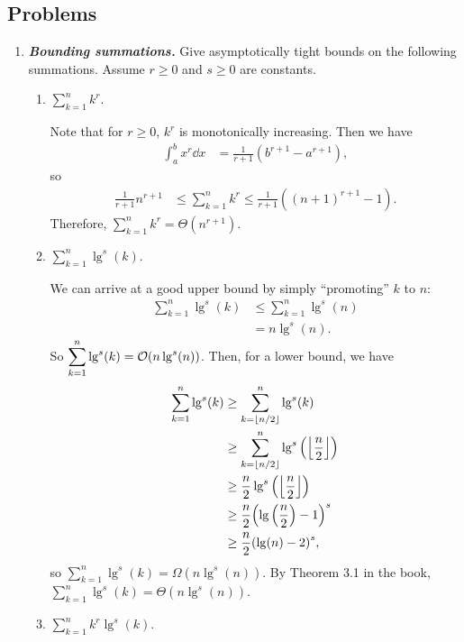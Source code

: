 \documentclass[AppendixA]{subfiles}
\begin{document}
	\subsection*{Problems}

	\begin{enumerate}[leftmargin=\labelsep,label={\textbf{\thesection-\arabic*}}]
		\item \textbf{\textit{Bounding summations.}} Give asymptotically tight bounds on the following summations. Assume $r \geq 0$ and $s \geq 0$ are constants.
		\begin{enumerate}
			\item $\displaystyle \sum_{k = 1}^n k^r$.
			\begin{answer}
				Note that for $r \geq 0$, $k^r$ is monotonically increasing. Then we have
				\begin{align*}
					\int_a^b x^r \dd x &= \frac{1}{r + 1}(b^{r + 1} - a^{r + 1}),
				\end{align*}
				so
				\begin{align*}
					\frac{1}{r + 1} n^{r + 1} &\leq \sum_{k = 1}^n k^r \leq \frac{1}{r + 1}((n + 1)^{r + 1} - 1).
				\end{align*}
				Therefore, $\displaystyle \sum_{k = 1}^n k^r = \Theta(n^{r + 1})$.
			\end{answer}

			\item \label{exer:appA-log-sum-bound} $\displaystyle \sum_{k = 1}^n \lg^s(k)$.
			\begin{answer}
				We can arrive at a good upper bound by simply ``promoting'' $k$ to $n$:
				\begin{align*}
					\sum_{k = 1}^n \lg^s(k) &\leq \sum_{k = 1}^n \lg^s(n)\\
						&= n\lg^s(n).
				\end{align*}
				So $\displaystyle \sum_{k = 1}^n \lg^s(k) = \mathcal{O}(n\lg^s(n))$. Then, for a lower bound, we have
				\begin{align*}
					\sum_{k = 1}^n \lg^s(k) &\geq \sum_{k = \lfloor n / 2 \rfloor}^n \lg^s(k)\\
						&\geq \sum_{k = \lfloor n / 2 \rfloor}^n \lg^s \qty(\left\lfloor \frac{n}{2} \right\rfloor)\\
						&\geq \frac{n}{2} \lg^s\qty(\left\lfloor \frac{n}{2} \right\rfloor)\\
						&\geq \frac{n}{2} \qty(\lg \qty(\frac{n}{2}) - 1)^s\\
						&\geq \frac{n}{2} \qty(\lg(n) - 2)^s,
				\end{align*}
				so $\displaystyle \sum_{k = 1}^n \lg^s(k) = \Omega(n\lg^s(n))$. By Theorem 3.1 in the book, $\displaystyle \sum_{k = 1}^n \lg^s(k) = \Theta(n\lg^s(n))$.
			\end{answer}
			
			\item $\displaystyle \sum_{k = 1}^n k^r\lg^s(k)$.
			\begin{answer}
				
			\end{answer}
			
		\end{enumerate}
	\end{enumerate}
\end{document}
